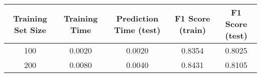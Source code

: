 \documentclass[11pt]{article}
\begin{document}
\begin{longtable}[]{@{}ccccc@{}}
\toprule
\begin{minipage}[b]{0.16\columnwidth}\centering\strut
Training Set Size\strut
\end{minipage} & \begin{minipage}[b]{0.21\columnwidth}\centering\strut
Training Time\strut
\end{minipage} & \begin{minipage}[b]{0.20\columnwidth}\centering\strut
Prediction Time (test)\strut
\end{minipage} & \begin{minipage}[b]{0.15\columnwidth}\centering\strut
F1 Score (train)\strut
\end{minipage} & \begin{minipage}[b]{0.14\columnwidth}\centering\strut
F1 Score (test)\strut
\end{minipage}\tabularnewline
\midrule
\endhead
\begin{minipage}[t]{0.16\columnwidth}\centering\strut
100\strut
\end{minipage} & \begin{minipage}[t]{0.21\columnwidth}\centering\strut
0.0020\strut
\end{minipage} & \begin{minipage}[t]{0.20\columnwidth}\centering\strut
0.0020\strut
\end{minipage} & \begin{minipage}[t]{0.15\columnwidth}\centering\strut
0.8354\strut
\end{minipage} & \begin{minipage}[t]{0.14\columnwidth}\centering\strut
0.8025\strut
\end{minipage}\tabularnewline
\begin{minipage}[t]{0.16\columnwidth}\centering\strut
200\strut
\end{minipage} & \begin{minipage}[t]{0.21\columnwidth}\centering\strut
0.0080\strut
\end{minipage} & \begin{minipage}[t]{0.20\columnwidth}\centering\strut
0.0040\strut
\end{minipage} & \begin{minipage}[t]{0.15\columnwidth}\centering\strut
0.8431\strut
\end{minipage} & \begin{minipage}[t]{0.14\columnwidth}\centering\strut
0.8105\strut
\end{minipage}\tabularnewline

\end{longtable}
\end{document}
